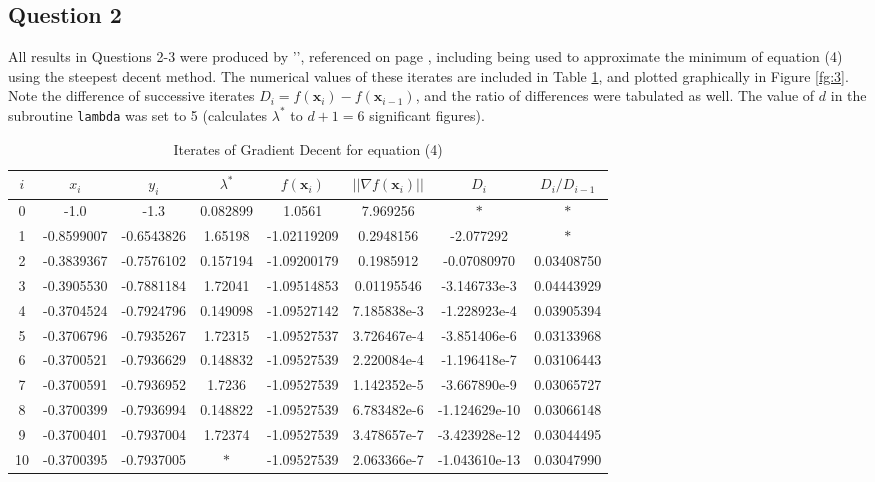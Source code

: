 \documentclass[10pt,a4paper,notitlepage]{article}
\newcommand{\abs}[1]{\lvert#1\rvert}
\newcommand{\x}{\mathbf{x}}
\begin{document}
\subsection*{\centering Question 2}
All results in Questions 2-3 were produced by '', referenced on page \pageref{cd:1}, including being used to approximate the minimum of equation (4) using the steepest decent method. The numerical values of these iterates are included in Table \ref{tb:1}, and plotted graphically in Figure \ref{fg:3}. Note the difference of successive iterates $D_{i}=f(\x_{i})-f(\x_{i-1})$, and the ratio of differences were tabulated as well. The value of $d$ in the subroutine \texttt{lambda} was set to 5 (calculates $\lambda^{*}$ to $d+1=6$ significant figures).

\begin{table}[H]
\centering
\begin{tabular}{|cccccccc|} \hline $i$ & $x_{i}$ & $y_{i}$ & $\lambda^{*}$ & $f(\x_{i})$ & $\abs{\abs{\nabla f(\x_{i})}}$& $D_{i}$ & $D_{i}/D_{i-1}$ \\
\hline
0 & -1.0 & -1.3 & 0.082899 & 1.0561 & 7.969256 & $\ast$ & $\ast$ \\ 
1 & -0.8599007 & -0.6543826 & 1.65198 & -1.02119209 & 0.2948156 & -2.077292 & $\ast$ \\ 
2 & -0.3839367 & -0.7576102 & 0.157194 & -1.09200179 & 0.1985912 & -0.07080970 & 0.03408750 \\ 
3 & -0.3905530 & -0.7881184 & 1.72041 & -1.09514853 & 0.01195546 & -3.146733e-3 & 0.04443929 \\ 
4 & -0.3704524 & -0.7924796 & 0.149098 & -1.09527142 & 7.185838e-3 & -1.228923e-4 & 0.03905394 \\ 
5 & -0.3706796 & -0.7935267 & 1.72315 & -1.09527537 & 3.726467e-4 & -3.851406e-6 & 0.03133968 \\ 
6 & -0.3700521 & -0.7936629 & 0.148832 & -1.09527539 & 2.220084e-4 & -1.196418e-7 & 0.03106443 \\ 
7 & -0.3700591 & -0.7936952 & 1.7236 & -1.09527539 & 1.142352e-5 & -3.667890e-9 & 0.03065727 \\ 
8 & -0.3700399 & -0.7936994 & 0.148822 & -1.09527539 & 6.783482e-6 & -1.124629e-10 & 0.03066148 \\ 
9 & -0.3700401 & -0.7937004 & 1.72374 & -1.09527539 & 3.478657e-7 & -3.423928e-12 & 0.03044495 \\ 
10 & -0.3700395 & -0.7937005 & $\ast$ & -1.09527539 & 2.063366e-7 & -1.043610e-13 & 0.03047990 \\ \hline \end{tabular}
\caption{Iterates of Gradient Decent for equation (4)}\label{tb:1}
\end{table}
\end{document}

